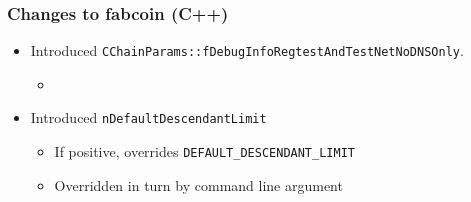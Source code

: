 \begin{frame}[fragile]
\frametitle{Changes to fabcoin (C++)}
\begin{itemize}
\item Introduced \verb|CChainParams::fDebugInfoRegtestAndTestNetNoDNSOnly|.
\begin{itemize}
\item 
\end{itemize}
\item Introduced  \verb|nDefaultDescendantLimit|
\begin{itemize}
	\item If positive, overrides \verb|DEFAULT_DESCENDANT_LIMIT|
	\item Overridden in turn by command line argument 
	
\end{itemize}
\end{itemize}

\end{frame}
